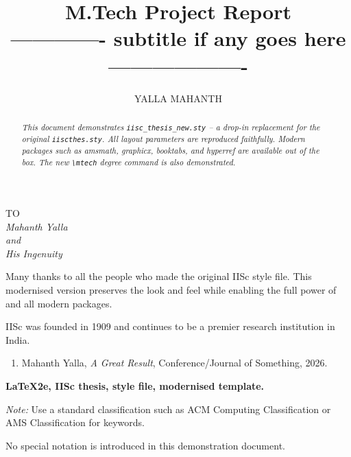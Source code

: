 \documentclass[12pt,a4paper]{report}
\title{
  M.Tech Project Report\\
  \large ------------- subtitle if any goes here -------------------
 }
\author{YALLA MAHANTH}
\begin{document}

\begin{frontmatter}

\maketitle



\begin{dedication}
  \begin{center}
    TO \\[2em]
    \large\itshape Mahanth Yalla \\
    and \\
    \large\itshape His Ingenuity
  \end{center}
\end{dedication}

\acknowledgements
Many thanks to all the people who made the original IISc style file.
This modernised version preserves the look and feel while enabling
the full power of \LaTeXe{} and all modern packages.

\vita
IISc was founded in 1909 and continues to be a premier research
institution in India.

\publications
\begin{enumerate}
  \item Mahanth Yalla, \textit{A Great Result}, Conference/Journal of Something, 2026.
\end{enumerate}

\begin{abstract}
\slshape
This document demonstrates \texttt{iisc\_thesis\_new.sty} -- a drop-in
\LaTeXe{} replacement for the original \texttt{iiscthes.sty}.
All layout parameters are reproduced faithfully.
Modern packages such as \textsf{amsmath}, \textsf{graphicx},
\textsf{booktabs}, and \textsf{hyperref} are available out of the box.
The new \verb|\mtech| degree command is also demonstrated.
\end{abstract}

\makecontents

\keywords
{\large\bfseries LaTeX2e, IISc thesis, style file, modernised template.}

\vspace{10mm}
\noindent
\textit{Note:} Use a standard classification such as ACM Computing
Classification or AMS Classification for keywords.

\notations
No special notation is introduced in this demonstration document.

\end{frontmatter}
\end{document}
